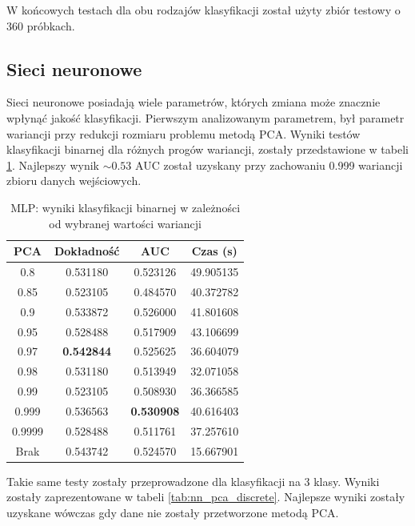 \documentclass[a4paper, twoside, 11pt, openright]{article}
\begin{document}
W końcowych testach dla obu rodzajów klasyfikacji został użyty zbiór testowy o 360 próbkach.

\subsection{Sieci neuronowe}

Sieci neuronowe posiadają wiele parametrów, których zmiana może znacznie wpłynąć jakość klasyfikacji. Pierwszym analizowanym parametrem, był parametr wariancji przy redukcji rozmiaru problemu metodą PCA. Wyniki testów klasyfikacji binarnej dla różnych progów wariancji, zostały przedstawione w tabeli \ref{tab:nn_pca_binary}.  Najlepszy wynik $\sim 0.53$ AUC został uzyskany przy zachowaniu 0.999 wariancji zbioru danych wejściowych.

\begin{table}[H]
    \centering
    \begin{tabular}{|c|c|c|c|}
    \hline
        \textbf{PCA} & \textbf{Dokładność} &  \textbf{AUC} &  \textbf{Czas (s)} \\ \hline
0.8                &  0.531180 &  0.523126 &   49.905135 \\ \hline
0.85               &  0.523105 &  0.484570 &   40.372782 \\ \hline
0.9                &  0.533872 &  0.526000 &   41.801608 \\ \hline
0.95               &  0.528488 &  0.517909 &   43.106699 \\ \hline
0.97               &  \textbf{0.542844} &  0.525625 &   36.604079 \\ \hline
0.98               &  0.531180 &  0.513949 &   32.071058 \\ \hline
0.99               &  0.523105 &  0.508930 &   36.366585 \\ \hline
0.999              &  0.536563 &  \textbf{0.530908} &   40.616403 \\ \hline
0.9999             &  0.528488 &  0.511761 &   37.257610 \\ \hline
Brak               &  0.543742 &  0.524570 &   15.667901 \\ \hline

    \end{tabular}
    \caption{MLP: wyniki klasyfikacji binarnej w zależności od wybranej wartości wariancji}
    \label{tab:nn_pca_binary}
\end{table}

Takie same testy zostały przeprowadzone dla klasyfikacji na 3 klasy. Wyniki zostały zaprezentowane w tabeli \ref{tab:nn_pca_discrete}. Najlepsze wyniki zostały uzyskane wówczas gdy dane nie zostały przetworzone metodą PCA.
\end{document}
